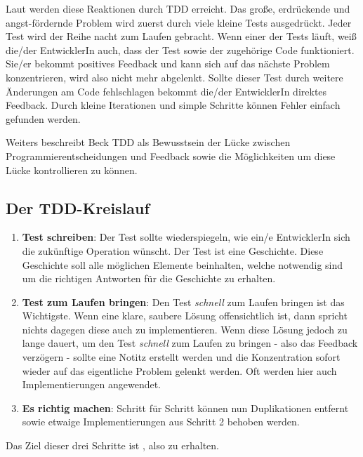 Laut \cite{Beck:2003} werden diese Reaktionen durch TDD erreicht. Das große, erdrückende und angst-fördernde Problem wird zuerst durch viele kleine Tests ausgedrückt. Jeder Test wird der Reihe nacht zum Laufen gebracht. Wenn einer der Tests läuft, weiß die/der EntwicklerIn auch, dass der Test sowie der zugehörige Code funktioniert. Sie/er bekommt positives Feedback und kann sich auf das nächste Problem konzentrieren, wird also nicht mehr abgelenkt. Sollte dieser Test durch weitere Änderungen am Code fehlschlagen bekommt die/der EntwicklerIn direktes Feedback. Durch kleine Iterationen und simple Schritte können Fehler einfach gefunden werden.

Weiters beschreibt Beck TDD als Bewusstsein der Lücke zwischen Programmierentscheidungen und Feedback sowie die Möglichkeiten um diese Lücke kontrollieren zu können.

\subsection{Der TDD-Kreislauf}
\begin{enumerate}
  \item \textbf{Test schreiben}:\newline
  Der Test sollte wiederspiegeln, wie ein/e EntwicklerIn sich die zukünftige Operation wünscht. Der Test ist eine Geschichte. Diese Geschichte soll alle möglichen Elemente beinhalten, welche notwendig sind um die richtigen Antworten für die Geschichte zu erhalten.
  \item \textbf{Test zum Laufen bringen}:\newline
  Den Test \textit{schnell} zum Laufen bringen ist das Wichtigste. Wenn eine klare, saubere Lösung offensichtlich ist, dann spricht nichts dagegen diese auch zu implementieren. Wenn diese Lösung jedoch zu lange dauert, um den Test \textit{schnell} zum Laufen zu bringen - also das  Feedback verzögern - sollte eine Notitz erstellt werden und die Konzentration sofort wieder auf das eigentliche Problem gelenkt werden. Oft werden hier auch  Implementierungen angewendet.
  \item \textbf{Es richtig machen}:\newline
  Schritt für Schritt können nun Duplikationen entfernt sowie etwaige  Implementierungen aus Schritt 2 behoben werden.
\end{enumerate}

Das Ziel dieser drei Schritte ist , also  zu erhalten.

